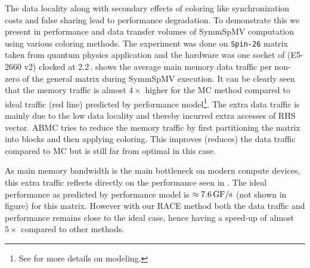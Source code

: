 The data locality along with secondary effects of coloring like 
synchronization costs and false sharing lead to performance degradation.
To demonstrate this we present in  performance and 
data transfer volumes of \acrshort{SymmSpMV} computation using various coloring methods.
The experiment was done on \texttt{Spin-26} matrix taken from quantum physics application
and the hardware was one socket of \Intel \IVB (E5-2660 v2) clocked at 2.2\,\GHZ.
 shows the average main memory data traffic per non-zero  of the 
general matrix during \acrshort{SymmSpMV} execution. It can be clearly seen that 
the memory traffic is almost  $4 \times$ higher 
for the \acrshort{MC} method compared to ideal traffic (red line) predicted
by performance model\footnote{See  for more details on modeling.}.
The extra data traffic is mainly due to the low data locality and thereby incurred 
extra accesses of RHS vector. 
\Acrfull{ABMC} tries to reduce the memory traffic by first partitioning the matrix
into blocks and then applying coloring. This improves (reduces) the data traffic compared 
to \acrshort{MC} but is still far from optimal in this case. 

As main memory bandwidth is the main bottleneck on modern compute devices,
 this extra traffic reflects directly on the performance 
 seen in . The ideal 
 performance as predicted by performance model is $\approx 7.6\,\mbox{GF/s}$ (not shown in figure)
 for this matrix. 
 However with our \acrshort{RACE} method both the data traffic and performance 
 remains close to the ideal case, hence having a speed-up of almost
  $5\times$ compared to other methods.

